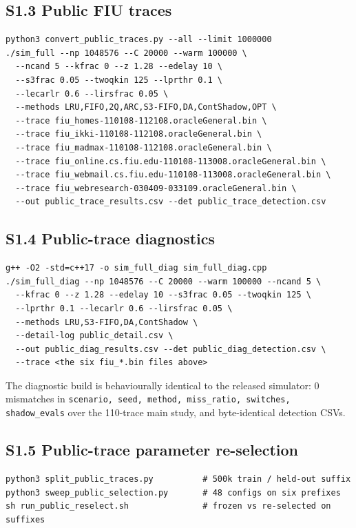 \documentclass[journal]{IEEEtran}
\begin{document}
\subsection{S1.3 Public FIU traces}
\begin{verbatim}
python3 convert_public_traces.py --all --limit 1000000
./sim_full --np 1048576 --C 20000 --warm 100000 \
  --ncand 5 --kfrac 0 --z 1.28 --edelay 10 \
  --s3frac 0.05 --twoqkin 125 --lprthr 0.1 \
  --lecarlr 0.6 --lirsfrac 0.05 \
  --methods LRU,FIFO,2Q,ARC,S3-FIFO,DA,ContShadow,OPT \
  --trace fiu_homes-110108-112108.oracleGeneral.bin \
  --trace fiu_ikki-110108-112108.oracleGeneral.bin \
  --trace fiu_madmax-110108-112108.oracleGeneral.bin \
  --trace fiu_online.cs.fiu.edu-110108-113008.oracleGeneral.bin \
  --trace fiu_webmail.cs.fiu.edu-110108-113008.oracleGeneral.bin \
  --trace fiu_webresearch-030409-033109.oracleGeneral.bin \
  --out public_trace_results.csv --det public_trace_detection.csv
\end{verbatim}

\subsection{S1.4 Public-trace diagnostics}
\begin{verbatim}
g++ -O2 -std=c++17 -o sim_full_diag sim_full_diag.cpp
./sim_full_diag --np 1048576 --C 20000 --warm 100000 --ncand 5 \
  --kfrac 0 --z 1.28 --edelay 10 --s3frac 0.05 --twoqkin 125 \
  --lprthr 0.1 --lecarlr 0.6 --lirsfrac 0.05 \
  --methods LRU,S3-FIFO,DA,ContShadow \
  --detail-log public_detail.csv \
  --out public_diag_results.csv --det public_diag_detection.csv \
  --trace <the six fiu_*.bin files above>
\end{verbatim}
The diagnostic build is behaviourally identical to the released simulator:
0 mismatches in \texttt{scenario, seed, method, miss\_ratio, switches,
shadow\_evals} over the 110-trace main study, and byte-identical detection CSVs.

\subsection{S1.5 Public-trace parameter re-selection}
\begin{verbatim}
python3 split_public_traces.py          # 500k train / held-out suffix
python3 sweep_public_selection.py       # 48 configs on six prefixes
sh run_public_reselect.sh               # frozen vs re-selected on suffixes
\end{verbatim}
\end{document}
